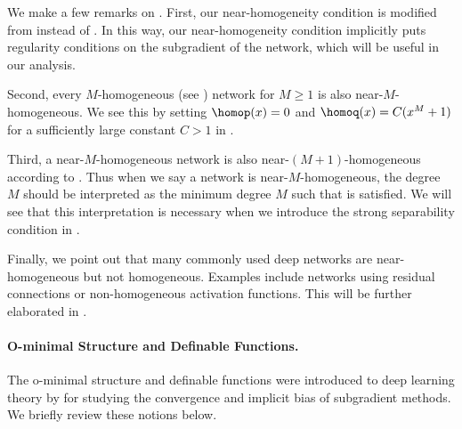 We make a few remarks on . 
First, our near-homogeneity condition is modified from  instead of . In this way, our near-homogeneity condition implicitly puts regularity conditions on the subgradient of the network, which will be useful in our analysis.  

Second, every $M$-homogeneous (see ) network for $M\ge 1$ is also near-$M$-homogeneous. 
We see this by setting $\homop(x)=0$ and $\homoq(x) = C (x^M+1)$ for a sufficiently large constant $C>1$ in . 

Third, a near-$M$-homogeneous network is also near-$(M+1)$-homogeneous according to . Thus when we say a network is near-$M$-homogeneous, the degree $M$ should be interpreted as the minimum degree $M$ such that  is satisfied. 
We will see that this interpretation is necessary when we introduce the strong separability condition in .

Finally, we point out that many commonly used deep networks are near-homogeneous but not homogeneous. Examples include networks using residual connections or non-homogeneous activation functions.
This will be further elaborated in . 




\paragraph{O-minimal Structure and Definable Functions.}
The o-minimal structure and definable functions 
were introduced to deep learning theory by \citet{davis2020stochastic,ji2020directional} for studying the convergence and implicit bias of subgradient methods. 
We briefly review these notions below.

